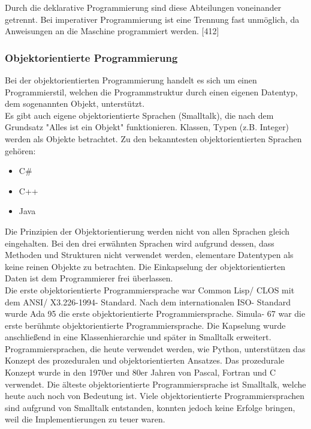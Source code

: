\documentclass[12pt,a4paper]{report}
\begin{document}
\begin{onehalfspace}
Durch die deklarative Programmierung sind diese Abteilungen voneinander getrennt. Bei imperativer Programmierung ist eine Trennung fast unmöglich, da Anweisungen an die Maschine programmiert werden. [412]

\subsubsection{Objektorientierte Programmierung}
Bei der objektorientierten Programmierung handelt es sich um einen Programmierstil, welchen die Programmstruktur durch einen eigenen Datentyp, dem sogenannten Objekt, unterstützt.\\

Es gibt auch eigene objektorientierte Sprachen (Smalltalk), die nach dem Grundsatz "{}Alles ist ein Objekt"{} funktionieren. Klassen, Typen (z.B. Integer) werden als Objekte betrachtet. Zu den bekanntesten objektorientierten Sprachen gehören:
\begin{itemize}
\item C\#
\item C++
\item Java
\end{itemize}
Die Prinzipien der Objektorientierung werden nicht von allen Sprachen gleich eingehalten. Bei den drei erwähnten Sprachen wird aufgrund dessen, dass Methoden und Strukturen nicht verwendet werden, elementare Datentypen als keine reinen Objekte zu betrachten. Die Einkapselung der objektorientierten Daten ist dem Programmierer frei überlassen.\\

Die erste objektorientierte Programmiersprache war Common Lisp/ CLOS mit dem ANSI/ X3.226-1994- Standard. Nach dem internationalen ISO- Standard wurde Ada 95 die erste objektorientierte Programmiersprache.
Simula- 67 war die erste berühmte objektorientierte Programmiersprache. Die Kapselung wurde anschließend in eine Klassenhierarchie und später in Smalltalk erweitert.\\

Programmiersprachen, die heute verwendet werden, wie Python, unterstützen das Konzept des prozeduralen und objektorientierten Ansatzes. Das prozedurale Konzept wurde in den 1970er und 80er Jahren von Pascal, Fortran und C verwendet. Die älteste objektorientierte Programmiersprache ist Smalltalk, welche heute auch noch von Bedeutung ist. Viele objektorientierte Programmiersprachen sind aufgrund von Smalltalk entstanden, konnten jedoch keine Erfolge bringen, weil die Implementierungen zu teuer waren.\\


\end{onehalfspace}
\end{document}
